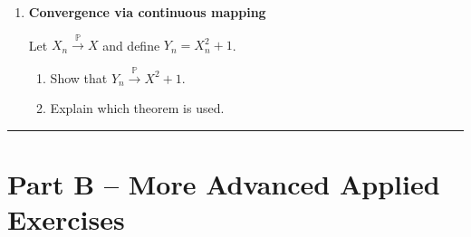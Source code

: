 \documentclass[11pt]{article}
\begin{document}
\begin{enumerate}
\bigskip

\item \textbf{Convergence via continuous mapping}

Let $X_n\xrightarrow{\mathbb{P}}X$ and define $Y_n=X_n^2+1$.

\begin{enumerate}
\item Show that $Y_n\xrightarrow{\mathbb{P}}X^2+1$.
\item Explain which theorem is used.
\end{enumerate}

\end{enumerate}

\bigskip
\hrule
\bigskip

\section*{Part B -- More Advanced Applied Exercises}
\end{document}
